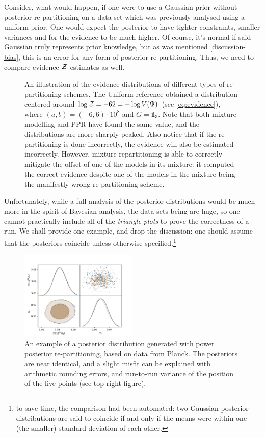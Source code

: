 \documentclass[usenatbib]{mnras}
\begin{document}
Consider, what would happen, if one were to use a Gaussian prior
without posterior re-partitioning on a data set which was
previously analysed using a uniform prior. One would expect the
posterior to have tighter constraints, smaller variances and for
the evidence to be much higher. Of course, it's normal if said
Gaussian truly represents prior knowledge, but as was mentioned
\cref{discussion-bias}, this is an error for any form of posterior
re-partitioning. Thus, we need to compare evidence \({\cal Z}\)
estimates as well.

\begin{figure}

\caption{An illustration of the evidence distributions of different types of re-partitioning schemes. The Uniform reference obtained a distribution centered around \(\log {\cal Z} = -62 = - \log V(\Psi)\) (see \cref{eq:evidence}), where \((a,b)=(-6, 6)\cdot 10^{8}\) and \(G=\mathds{1}_{3}\). Note that both mixture modelling and PPR have found the same value, and the distributions are more sharply peaked. Also notice that if the re-partitioning is done incorrectly, the evidence will also be estimated incorrectly. However, mixture repartitioning is able to correctly mitigate the offset of one of the models in its mixture: it computed the correct evidence despite one of the models in the mixture being the manifestly wrong re-partitioning scheme.\label{fig:hist}}
\end{figure}

Unfortunately, while a full analysis of the posterior distributions
would be much more in the spirit of Bayesian analysis, the
data-sets being are huge, so one cannot practically include all of
the \emph{triangle plots} to prove the correctness of a run. We shall
provide one example, and drop the discussion: one should assume
that the posteriors coincide unless otherwise specified.\footnote{to save
time, the comparison had been automated: two Gaussian posterior
distributions are said to coincide if and only if the means were
within one (the smaller) standard deviation of each other.}

\begin{figure}
 \includegraphics[width=0.5\textwidth]{./illustrations/misfit.pdf}
\caption{An example of a posterior distribution generated with power posterior re-partitioning, based on data from Planck. The posteriors are near identical, and a slight misfit can be explained with arithmetic rounding errors, and run-to-run variance of the position of the live points (see top right figure).\label{fig:overlay-posteriors}}
\end{figure}
\end{document}
